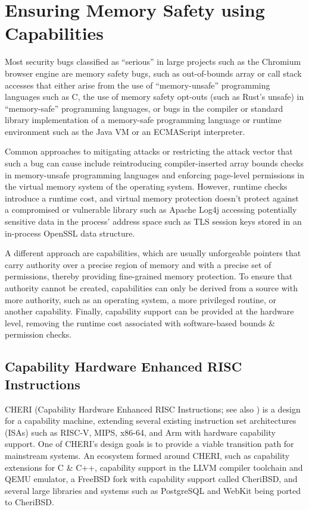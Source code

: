 \documentclass[main.tex]{subfiles}
\begin{document}
\onlyinsubfile{\mainmatter{}}

\chapter{Ensuring Memory Safety using Capabilities}
Most security bugs classified as “serious” in large projects such as the Chromium browser engine are memory safety bugs,\cite{chromium} such as out-of-bounds array or call stack accesses that either arise from the use of “memory-unsafe” programming languages such as C, the use of memory safety opt-outs (such as Rust’s unsafe) in “memory-safe” programming languages, or bugs in the compiler or standard library implementation of a memory-safe programming language or runtime environment such as the Java VM or an ECMAScript interpreter.

Common approaches to mitigating attacks or restricting the attack vector that such a bug can cause include reintroducing compiler-inserted array bounds checks in memory-unsafe programming languages and enforcing page-level permissions in the virtual memory system of the operating system. However, runtime checks introduce a runtime cost, and virtual memory protection doesn’t protect against a compromised or vulnerable library such as Apache Log4j accessing potentially sensitive data in the process’ address space such as TLS session keys stored in an in-process OpenSSL data structure.

A different approach are capabilities, which are usually unforgeable pointers that carry authority over a precise region of memory and with a precise set of permissions, thereby providing fine-grained memory protection. To ensure that authority cannot be created, capabilities can only be derived from a source with more authority, such as an operating system, a more privileged routine, or another capability. Finally, capability support can be provided at the hardware level, removing the runtime cost associated with software-based bounds \& permission checks.

\section{Capability Hardware Enhanced RISC Instructions}
CHERI (Capability Hardware Enhanced RISC Instructions; see also \cite{intro2cheri}) is a design for a capability machine, extending several existing instruction set architectures (ISAs) such as RISC-V, MIPS, x86-64, and Arm with hardware capability support. One of CHERI’s design goals is to provide a viable transition path for mainstream systems. An ecosystem formed around CHERI, such as capability extensions for C \& C++, capability support in the LLVM compiler toolchain and QEMU emulator, a FreeBSD fork with capability support called CheriBSD, and several large libraries and systems such as PostgreSQL and WebKit being ported to CheriBSD.
\end{document}
